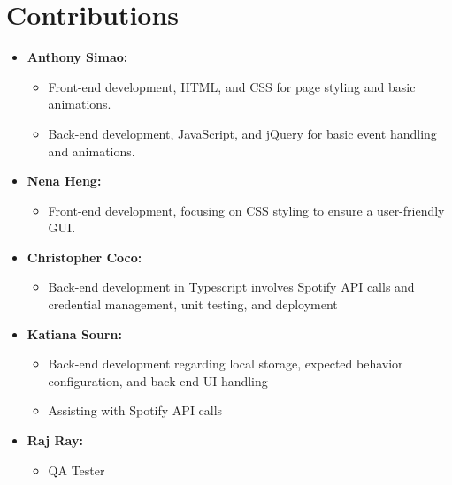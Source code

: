 \documentclass{article}
\begin{document}

\section{Contributions}
\begin{itemize}
     \item \textbf{Anthony Simao:}
        \begin{itemize}
            \item Front-end development, HTML, and CSS for page styling and basic animations.
            \item Back-end development, JavaScript, and jQuery for basic event handling and animations.
        \end{itemize}
    \item \textbf{Nena Heng:}
        \begin{itemize}
            \item Front-end development, focusing on CSS styling to ensure a user-friendly GUI.
        \end{itemize}
    \item \textbf{Christopher Coco:}
        \begin{itemize}
            \item Back-end development in Typescript involves Spotify API calls and credential management, unit testing, and deployment
        \end{itemize}
    \item \textbf{Katiana Sourn:}
        \begin{itemize}
            \item Back-end development regarding local storage, expected behavior configuration, and back-end UI handling
            \item Assisting with Spotify API calls
        \end{itemize}
    \item \textbf{Raj Ray:}
        \begin{itemize}
            \item QA Tester
        \end{itemize}      
\end{itemize}
\end{document}
